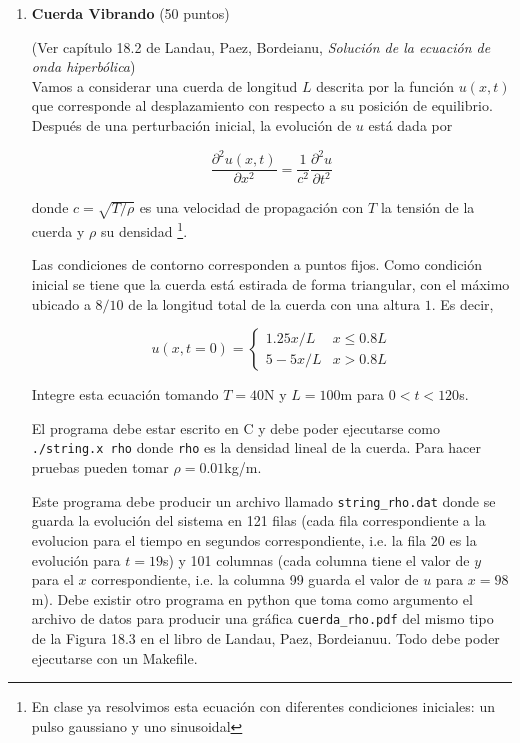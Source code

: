 \documentclass{article}
\begin{document}
\begin{enumerate}

\item {\bf Cuerda Vibrando} (50 puntos)

(Ver cap\'itulo 18.2 de Landau, Paez, Bordeianu, {\it Soluci\'on de la
  ecuaci\'on de onda hiperb\'olica})\\

Vamos a considerar una cuerda de longitud $L$ descrita por la funci\'on
$u(x,t)$ que corresponde al desplazamiento con respecto a su
posici\'on de equilibrio. Despu\'es de una perturbaci\'on inicial, la
evoluci\'on de $u$ est\'a dada por 

\begin{equation}
\frac{\partial^2 u (x,t)}{\partial x^2} =
\frac{1}{c^2}\frac{\partial^2 u}{\partial t^2}
\end{equation}

donde $c=\sqrt{T/\rho}$ es una velocidad de propagaci\'on con $T$ la
tensi\'on de la cuerda y $\rho$ su densidad \footnote{En clase ya
  resolvimos esta ecuaci\'on con diferentes condiciones iniciales:
  un pulso gaussiano y uno sinusoidal}.

Las condiciones de contorno corresponden a puntos fijos.  Como
condici\'on inicial se tiene que la cuerda est\'a estirada de forma triangular, con el m\'aximo ubicado a $8/10$ de la longitud
total de la cuerda con una altura $1$.  Es decir,

\begin{equation}
u(x,t=0) = 
\begin{cases}
1.25x/L & x \leq 0.8L\\
5-5x/L & x>0.8L
\end{cases}
\end{equation}

Integre esta ecuaci\'on tomando $T=40$N y $L=100$m para
$0<t<120$s. 

El programa debe estar escrito en C y debe poder ejecutarse como
\verb"./string.x rho" donde \verb"rho" es la densidad lineal de la
cuerda. Para hacer pruebas pueden tomar $\rho=0.01$kg/m. 

Este programa debe producir un archivo llamado \verb"string_rho.dat"
donde se guarda la evoluci\'on del sistema en 121 filas (cada fila
correspondiente a la evolucion para el tiempo en segundos
correspondiente, i.e. la fila 20 es la evoluci\'on para $t=19$s) y 101
columnas (cada columna tiene el valor de $y$ para el $x$
correspondiente, i.e. la columna 99 guarda el valor de $u$ para $x=98$m).
Debe existir otro programa en python que toma como argumento
el archivo de datos para producir una gr\'afica
\verb"cuerda_rho.pdf" del mismo tipo de la Figura 18.3 en el libro de
Landau, Paez, Bordeianuu. Todo debe poder ejecutarse con un Makefile. 




\end{enumerate}
\end{document}
